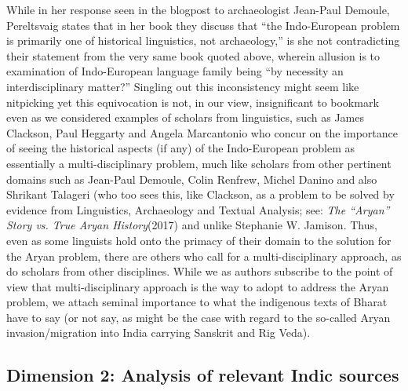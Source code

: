 While in her response seen in the blogpost to archaeologist Jean-Paul Demoule, Pereltsvaig states that in her book they discuss that “the Indo-European problem is primarily one of historical linguistics, not archaeology,” is she not contradicting their statement from the very same book quoted above, wherein allusion is to examination of Indo-European language family being “by necessity an interdisciplinary matter?” Singling out this inconsistency might seem like nitpicking yet this equivocation is not, in our view, insignificant to bookmark even as we considered examples of scholars from linguistics, such as James Clackson, Paul Heggarty and Angela Marcantonio who concur on the importance of seeing the historical aspects (if any) of the Indo-European problem as essentially a multi-disciplinary problem, much like scholars from other pertinent domains such as Jean-Paul Demoule, Colin Renfrew, Michel Danino and also Shrikant Talageri (who too sees this, like Clackson, as a problem to be solved by evidence from Linguistics, Archaeology and Textual Analysis; see: \textit{The “Aryan” Story vs. True Aryan History}(2017) and unlike Stephanie W. Jamison. Thus, even as some linguists hold onto the primacy of their domain to the solution for the Aryan problem, there are others who call for a multi-disciplinary approach, as do scholars from other disciplines. While we as authors subscribe to the point of view that multi-disciplinary approach is the way to adopt to address the Aryan problem, we attach seminal importance to what the indigenous texts of Bharat have to say (or not say, as might be the case with regard to the so-called Aryan invasion/migration into India carrying Sanskrit and Rig Veda).


\subsection{Dimension 2: Analysis of relevant Indic sources}

\vskip -7pt

